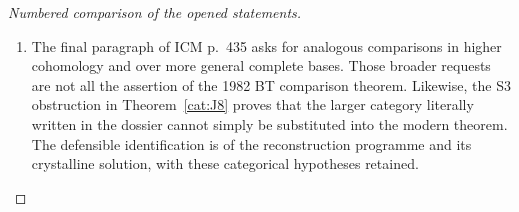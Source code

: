 \begin{proof}[Numbered comparison of the opened statements]
\begin{enumerate}
exactly the ICM article above.  Thus the historical link does not
depend on the later study's assertion alone.
\item The final paragraph of ICM p.~435 asks for analogous
comparisons in higher cohomology and over more general complete bases.
Those broader requests are not all the assertion of the 1982 BT
comparison theorem.  Likewise, the S3 obstruction in
Theorem~\ref{cat:J8} proves that the larger category literally written
in the dossier cannot simply be substituted into the modern theorem.
The defensible identification is of the reconstruction programme and
its crystalline solution, with these categorical hypotheses retained.
\end{enumerate}
\end{proof}

